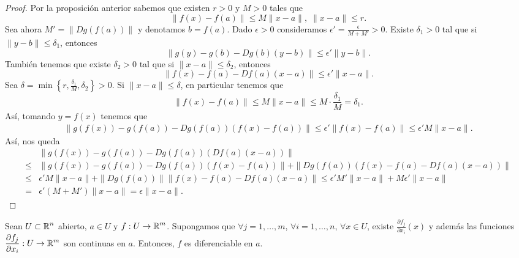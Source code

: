 \begin{proof}
Por la proposición anterior sabemos que existen $\displaystyle r > 0 $ y $\displaystyle M > 0 $ tales que 
\[\|f\left(x\right)-f\left(a\right)\| \leq M \|x-a\|, \; \|x-a\| \leq r .\]
Sea ahora $\displaystyle M' = \|Dg\left(f\left(a\right)\right)\| $ y denotamos $\displaystyle b = f\left(a\right) $. Dado $\displaystyle \epsilon > 0 $ consideramos $\displaystyle \epsilon ' = \frac{\epsilon }{M + M'} > 0 $. Existe $\displaystyle \delta _{1} > 0 $ tal que si $\displaystyle \|y - b\| \leq \delta _{1} $, entonces 
\[\|g\left(y\right)-g\left(b\right)-Dg\left(b\right)\left(y-b\right)\| \leq \epsilon '\|y - b\| .\]
También tenemos que existe $\displaystyle \delta _{2} > 0 $ tal que si $\displaystyle \|x-a\| \leq \delta_{2} $, entonces
\[\|f\left(x\right)-f\left(a\right)-Df\left(a\right)\left(x-a\right)\| \leq \epsilon ' \|x-a\| .\]
Sea $\displaystyle \delta = \min \left\{ r,\frac{\delta _{1}}{M}, \delta _{2}\right\} > 0 $. Si $\displaystyle \|x-a\| \leq \delta  $, en particular tenemos que
\[\|f\left(x\right)-f\left(a\right)\| \leq M \|x-a\| \leq M \cdot \frac{\delta _{1}}{M} = \delta _{1} .\]
Así, tomando $\displaystyle y = f\left(x\right) $ tenemos que
\[
\begin{split}
 \|g\left(f\left(x\right)\right)-g\left(f\left(a\right)\right) - Dg\left(f\left(a\right)\right)\left(f\left(x\right)-f\left(a\right)\right) \| \leq \epsilon ' \|f\left(x\right)-f\left(a\right)\| \leq \epsilon ' M \|x-a\|.
\end{split}
\]
Así, nos queda 
\[
\begin{split}
& \|g\left(f\left(x\right)\right)-g\left(f\left(a\right)\right) -Dg\left(f\left(a\right)\right)\left(Df\left(a\right)\left(x-a\right)\right)\| \\
\leq & \|g\left(f\left(x\right)\right)-g\left(f\left(a\right)\right) - Dg\left(f\left(a\right)\right)\left(f\left(x\right)-f\left(a\right)\right) \| + \|Dg\left(f\left(a\right)\right) \left(f\left(x\right)-f\left(a\right) -Df\left(a\right)\left(x-a\right) \right)\| \\
\leq & \epsilon ' M \|x-a\| + \|Dg\left(f\left(a\right)\right)\| \|f\left(x\right)-f\left(a\right) - Df\left(a\right)\left(x-a\right)\| \leq \epsilon ' M' \|x-a\| + M\epsilon ' \|x-a\|\\
= & \epsilon'\left(M + M'\right)\|x-a\| = \epsilon \|x-a\|.
\end{split}
\]
\end{proof}
\begin{theorem}
Sean $\displaystyle U \subset \mathbb{R}^{n} $ abierto, $\displaystyle a \in U $ y $\displaystyle f : U \to \mathbb{R}^{m} $. Supongamos que $\displaystyle \forall j = 1, \ldots, m $, $\displaystyle \forall i = 1, \ldots, n $, $\displaystyle \forall x \in U $, existe $\displaystyle \frac{\partial f_{j}}{\partial x_{i}}\left(x\right) $ y además las funciones $\displaystyle \frac{\partial f_{j}}{\partial x_{i}} : U \to \mathbb{R}^{m} $ son continuas en $\displaystyle a $. Entonces, $\displaystyle f $ es diferenciable en $\displaystyle a $.
\end{theorem}
